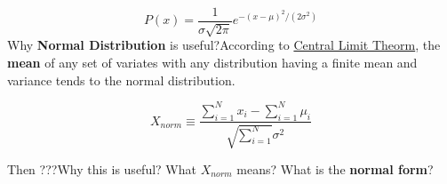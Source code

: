 \documentclass[12pt]{article}
\begin{document}
\begin{equation}
	P(x) = \frac{1}{\sigma\sqrt{2\pi}}e^{-(x-\mu)^2/(2\sigma^2)}
\end{equation}
Why \textbf{Normal Distribution} is useful?According to \href{http://mathworld.wolfram.com/CentralLimitTheorem.html}{Central Limit Theorm}, the \textbf{mean} of any set of variates with any distribution having a finite mean and variance tends to the normal distribution. 

\begin{equation}
X_{norm}\equiv\frac{\sum_{i=1}^Nx_{i}-\sum_{i=1}^N\mu_{i}}{\sqrt{\sum_{i=1}^N}\sigma^2}
\end{equation}

Then ???Why this is useful? What $X_{norm}$ means? What is the \textbf{normal form}?
\end{document}
